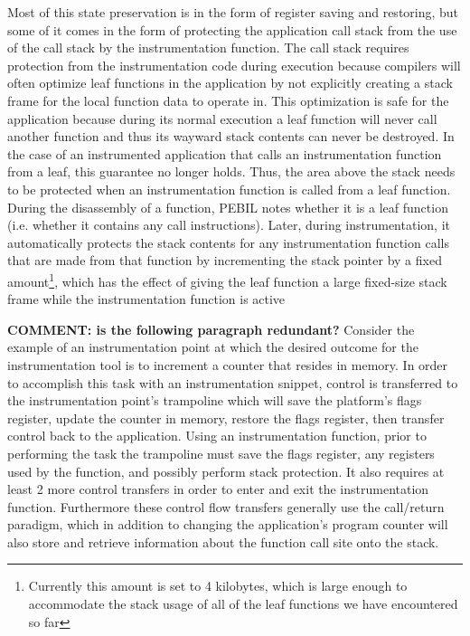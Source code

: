 Most of this state preservation is in the form of register saving and restoring, but 
some of it comes in the form of protecting the application call stack from the use of
the call stack by the instrumentation function. The call stack requires protection from the 
instrumentation code during execution because compilers will often optimize leaf functions in the application
by not explicitly creating a stack frame for the local function data to operate in. This optimization is safe for the application because during its
normal execution a leaf function will never call another function and thus its wayward stack contents 
can never be destroyed. In the case of an instrumented
application that calls an instrumentation function from a leaf, this guarantee no longer holds. Thus, the area above the stack needs to be protected when
an instrumentation function is called from a leaf function. During the disassembly 
of a function, PEBIL notes whether it is a leaf function (i.e. whether it contains any call
instructions). Later, during instrumentation, it automatically protects the stack contents 
for any instrumentation function calls that are made from that function by
incrementing the stack pointer by a fixed amount\footnote{Currently this amount is
set to 4 kilobytes, which is large enough to accommodate the stack usage of all
of the leaf functions we have encountered so far}, which has the effect of giving 
the leaf function a large fixed-size stack frame while the instrumentation
function is active

\textbf{COMMENT: is the following paragraph redundant?}
Consider the example of an instrumentation point at which the desired outcome 
for the instrumentation tool is to increment a counter that resides in memory. 
In order to accomplish this task with an instrumentation snippet, control is transferred to the
instrumentation point's trampoline which will save the platform's flags register, update the counter in memory, restore
the flags register, then transfer control back to the application. Using an instrumentation function, prior to performing
the task the trampoline must save the flags register, any registers used by the function, and
possibly perform stack protection.
It also requires at least 2 more control transfers in order to enter and exit the instrumentation function. 
Furthermore these control flow transfers generally use the call/return paradigm, which in addition to changing the
application's program counter will also store and retrieve information about the function call site onto the stack. 

